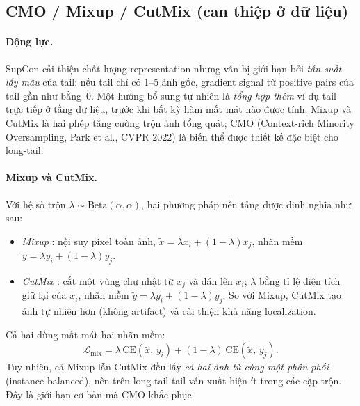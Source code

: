 \subsection{CMO / Mixup / CutMix (can thiệp ở dữ liệu)}

\paragraph{Động lực.}
SupCon cải thiện chất lượng representation nhưng vẫn bị giới hạn bởi
\emph{tần suất lấy mẫu} của tail: nếu tail chỉ có 1--5 ảnh gốc,
gradient signal từ positive pairs của tail gần như bằng~0.
Một hướng bổ sung tự nhiên là \emph{tổng hợp thêm} ví dụ tail trực tiếp
ở tầng dữ liệu, trước khi bất kỳ hàm mất mát nào được tính.
Mixup \cite{zhang2018mixup} và CutMix \cite{yun2019cutmix} là hai phép
tăng cường trộn ảnh tổng quát; CMO \cite{park2022cmo}
(Context-rich Minority Oversampling, Park et al., CVPR 2022) là biến thể
được thiết kế đặc biệt cho long-tail.

\paragraph{Mixup và CutMix.}
Với hệ số trộn $\lambda \sim \mathrm{Beta}(\alpha, \alpha)$,
hai phương pháp nền tảng được định nghĩa như sau:
\begin{itemize}
    \item \emph{Mixup} \cite{zhang2018mixup}:
    nội suy pixel toàn ảnh,
    $\tilde{x} = \lambda x_i + (1-\lambda) x_j$,
    nhãn mềm $\tilde{y} = \lambda y_i + (1-\lambda) y_j$.

    \item \emph{CutMix} \cite{yun2019cutmix}:
    cắt một vùng chữ nhật từ $x_j$ và dán lên $x_i$;
    $\lambda$ bằng tỉ lệ diện tích giữ lại của $x_i$,
    nhãn mềm $\tilde{y} = \lambda y_i + (1-\lambda) y_j$.
    So với Mixup, CutMix tạo ảnh tự nhiên hơn (không artifact)
    và cải thiện khả năng localization.
\end{itemize}
Cả hai dùng mất mát hai-nhãn-mềm:
\begin{equation}
    \mathcal{L}_{\text{mix}}
    = \lambda\,\mathrm{CE}(\tilde{x},\, y_i)
    + (1-\lambda)\,\mathrm{CE}(\tilde{x},\, y_j).
    \label{eq:mixloss}
\end{equation}
Tuy nhiên, cả Mixup lẫn CutMix đều lấy \emph{cả hai ảnh từ cùng một phân phối}
(instance-balanced), nên trên long-tail tail vẫn xuất hiện ít trong các cặp trộn.
Đây là giới hạn cơ bản mà CMO khắc phục.

